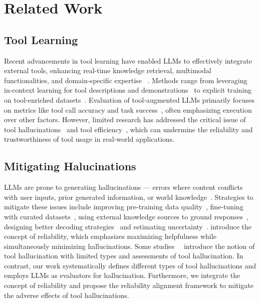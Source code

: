 \section{Related Work}
\subsection{Tool Learning}
Recent advancements in tool learning have enabled LLMs to effectively integrate external tools, enhancing real-time knowledge retrieval, multimodal functionalities, and domain-specific expertise ~\citep{yang2023chatgpt, gupta2023visual, jin2023genegpt}. Methods range from leveraging in-context learning for tool descriptions and demonstrations~\citep{hsieh2023tool} to explicit training on tool-enriched datasets~\citep{patil2023gorilla, tang2023toolalpaca, qin2023toolllm}. Evaluation of tool-augmented LLMs primarily focuses on metrics like tool call accuracy and task success~\citep{zhuang2023toolqa, guo2024stabletoolbench}, often emphasizing execution over other factors. However, limited research has addressed the critical issue of tool hallucinations~\citep{patil2023gorilla, chen2023teval} and tool efficiency~\citep{xu2025alignment}, which can undermine the reliability and trustworthiness of tool usage in real-world applications.

\subsection{Mitigating Halucinations}
LLMs are prone to generating hallucinations — errors where content conflicts with user inputs, prior generated information, or world knowledge~\citep{guerreiro2023hallucinations, mundler2023self, min2023factscore}. Strategies to mitigate these issues include improving pre-training data quality~\citep{penedo2023refinedweb, touvron2023llama}, fine-tuning with curated datasets~\citep{chen2023alpagasus, zhou2023lima}, using external knowledge sources to ground responses~\citep{gao2023retrieval,jain2024mitigating}, designing better decoding strategies~\citep{shi2023trusting} and estimating uncertainty~\citep{azaria2023internal, xiong2023can, zhao2023verify,varshney2023stitch}. \citealp{xu2024rejection,zheng2025enhancing} introduce the concept of reliability, which emphasizes maximizing helpfulness while simultaneously minimizing hallucinations. Some studies~~\citep{patil2023gorilla, chen2023teval,zhang2024toolbehonest} introduce the notion of tool hallucination with limited types and assessments of tool hallucination. In contrast, our work systematically defines different types of tool hallucinations and employs LLMs as evaluators for hallucination. Furthermore, we integrate the concept of reliability and propose the reliability alignment framework to mitigate the adverse effects of tool hallucinations.